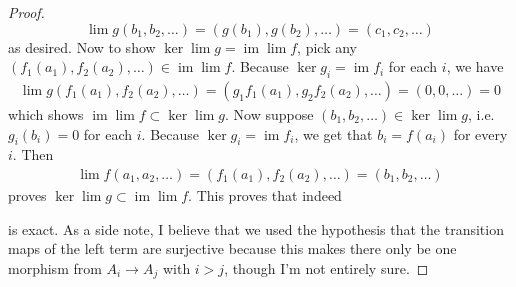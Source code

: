 \documentclass{article}
\DeclareMathOperator{\im}{im}
\begin{document}
\begin{proof}
    \[
    \lim g(b_1,b_2,\dots)=(g(b_1),g(b_2),\dots)=(c_1,c_2,\dots)
    \]
    as desired. Now to show $\ker \lim g=\im \lim f$, pick any $(f_1(a_1),f_2(a_2),\dots)\in \im \lim f$. Because $\ker g_i=\im f_i$ for each $i$, we have
    \begin{align*}
        \lim g(f_1(a_1),f_2(a_2),\dots)=(g_1f_1(a_1),g_2f_2(a_2),\dots)=(0,0,\dots)=0
    \end{align*}
    which shows $\im \lim f\subset \ker \lim g$. Now suppose $(b_1,b_2,\dots)\in \ker \lim g$, i.e. $g_i(b_i)=0$ for each $i$. Because $\ker g_i=\im f_i$, we get that $b_i=f(a_i)$ for every $i$. Then
    \begin{align*}
        \lim f (a_1,a_2,\dots)=(f_1(a_1),f_2(a_2),\dots)=(b_1,b_2,\dots)
    \end{align*}
    proves $\ker \lim g \subset \im \lim f$. This proves that indeed
    \begin{center}
    \end{center}
    is exact. As a side note, I believe that we used the hypothesis that the transition maps of the left term are surjective because this makes there only be one morphism from $A_i\to A_j$ with $i>j$, though I'm not entirely sure.
\end{proof}
\subsection{}
\printbibliography
\end{document}

